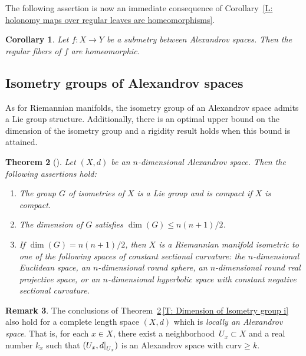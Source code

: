 \documentclass[pdftex]{sigma}
\numberwithin{equation}{section}
\newtheorem{thm}{Theorem}[section]
\newtheorem{cor}[thm]{Corollary}
\theoremstyle{definition}
\newtheorem{rem}[thm]{Remark}
\newcommand\restr[2]{{%
		\left.\kern-\nulldelimiterspace %
		#1 %
		\right|_{#2} %
}}
\begin{document}
The following assertion is now an immediate consequence of Corollary~\ref{L: holonomy maps over regular leaves are homeomorphisms}.



 \begin{cor}\label{C: regular fibers are homeomorphic}
 Let $f\colon X\to Y$ be a submetry between Alexandrov spaces. Then the regular fibers of $f$ are homeomorphic.
 \end{cor}



\subsection{Isometry groups of Alexandrov spaces}
\label{S: Isometry group of an Alexandrov space}
As for Riemannian manifolds, the isometry group of an Alexandrov space admits a Lie group structure.
Additionally, there is an optimal upper bound on the dimension of the isometry group and a rigidity result holds when this bound is attained.

	\begin{thm}[]
	\label{T: Dimension of Isometry group}
Let $(X,d)$ be an $n$-dimensional Alexandrov space. Then the following assertions hold:
\begin{enumerate}[label=$(\arabic*)$]\itemsep=0pt
\item The group $G$ of isometries of $X$ is a Lie group and is compact if $X$ is compact.\label{T: Dimension of Isometry group i}
\item The dimension of $G$ satisfies $\dim (G) \leq n(n+1)/2$.
\item If $\dim (G) = n(n+1)/2$, then $X$ is a Riemannian manifold isometric to one of the following spaces of constant sectional curvature: the $n$-dimensional Euclidean space, an $n$-dimen\-sional round sphere, an $n$-dimensional round real projective space, or an $n$-dimensional hyperbolic space with constant negative sectional curvature.
		\end{enumerate}
\end{thm}

\begin{rem}\label{R: isometry group of local. Alexandrov space is Lie}
The conclusions of Theorem~\ref{T: Dimension of Isometry group}\,\ref{T: Dimension of Isometry group i} also hold for a complete length space $(X,d)$ which is \emph{locally an Alexandrov space}. That is, for each $x\in X$, there exist a neighborhood~${U_x\subset X}$ and a real number $k_x$ such that $(U_x,\restr{d}{U_x})$ is an Alexandrov space with $\mathrm{curv}\geq k$.
\end{rem}
\end{document}
